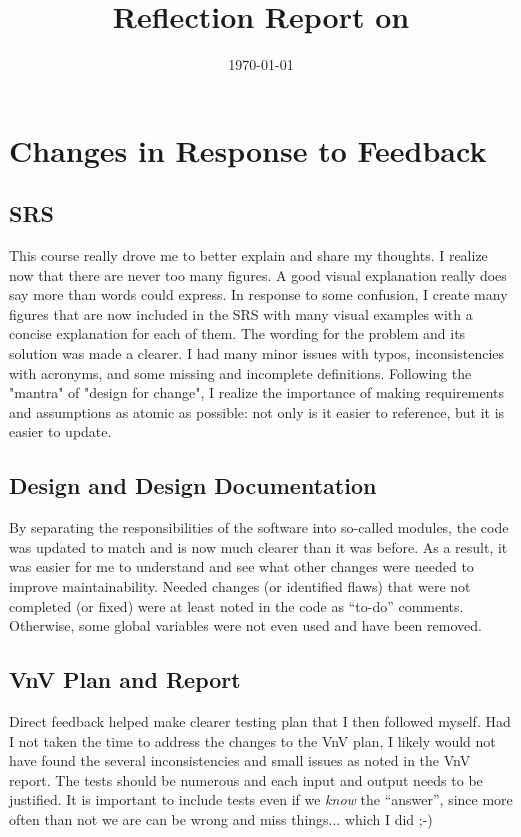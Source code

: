 \documentclass{article}
\title{Reflection Report on \progname}
\author{\authname}
\date{\today}
\begin{document}
\maketitle

\section{Changes in Response to Feedback}

\subsection{SRS}
This course really drove me to better explain and share my thoughts. 
I realize now that there are never too many figures. A good visual explanation
really does say more than words could express. In response to some confusion,
I create many figures that are now included in the SRS with many
visual examples with a concise explanation for each of them.
The wording for the problem and its solution was made a clearer.
I had many minor issues with typos, inconsistencies with acronyms, and
some missing and incomplete definitions.
Following the "mantra" of "design for change",
I realize the importance of making requirements and
assumptions as atomic as possible: not only is it easier to reference, but it
is easier to update.

\subsection{Design and Design Documentation}
By separating the responsibilities of the software into so-called modules,
the code was updated to match and is now much clearer than it was before.
As a result, it was easier for me to understand and see what 
other changes were needed to improve maintainability.
Needed changes (or identified flaws) that were
not completed (or fixed) were at least noted in the
code as ``to-do'' comments. Otherwise, some global variables were not even used
and have been removed.

\subsection{VnV Plan and Report}
Direct feedback helped make clearer testing plan that I then followed myself.
Had I not taken the time to address the changes to the VnV plan, I likely
would not have found the several inconsistencies and small issues as noted
in the VnV report.
The tests should be numerous and each input and output needs to be justified.
It is important to include tests even if we \textit{know} the ``answer'', since
more often than not we are can be wrong and miss things... which I did ;-)
\end{document}
